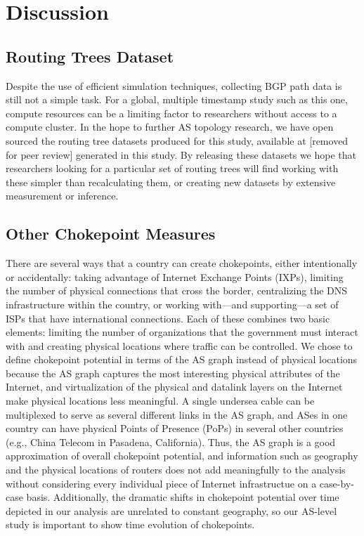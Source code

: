 \section{Discussion}

\subsection{Routing Trees Dataset}
Despite the use of efficient simulation techniques, collecting BGP path data is still not a simple task.
For a global, multiple timestamp study such as this one, compute resources can be a limiting factor to
researchers without access to a compute cluster.
In the hope to further AS topology research, we have open sourced the routing tree datasets produced for
this study, available at [removed for peer review] generated in this study. By releasing these datasets we 
hope that researchers looking for a particular set of routing trees will find working with these simpler 
than recalculating them, or creating new datasets by extensive measurement or
inference.

\subsection{Other Chokepoint Measures}
There are several ways that a country can create chokepoints, either intentionally or accidentally: taking advantage of Internet Exchange Points (IXPs),
limiting the number of physical connections that cross the border, centralizing
the DNS infrastructure within the country, or working
with---and supporting---a set of ISPs that have international connections.
Each of these combines two basic elements: limiting the number of organizations that the government must interact with and creating physical locations where traffic can be controlled.
We chose to define chokepoint potential in terms of the AS graph instead of physical locations because the AS graph captures the most interesting physical attributes of the Internet, and
virtualization of the physical and datalink layers on the Internet make physical locations less meaningful. A single undersea cable can be multiplexed to serve as several different links in
the AS graph, and ASes in one country can have physical Points of Presence (PoPs) in several other countries (e.g., China Telecom in Pasadena, California). Thus, the AS graph is a good approximation
of overall chokepoint potential, and information such as geography and the physical locations of routers does not add meaningfully to the analysis without considering every individual piece of Internet
infrastructue on a case-by-case basis. Additionally, the dramatic shifts in chokepoint potential over time depicted in our analysis are unrelated to constant geography, so our AS-level study is important
to show time evolution of chokepoints.

